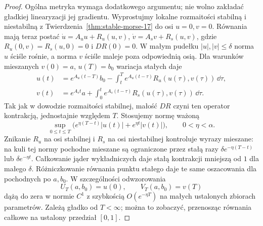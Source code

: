 \begin{proof}
Ogólna metryka wymaga dodatkowego argumentu;
nie wolno zakładać gładkiej linearyzacji jej gradientu.
Wyprostujmy lokalne rozmaitości stabilną i niestabilną
z Twierdzenia~\ref{thm:stable-morse-17} do osi $u=0,v=0$.
Równania mają teraz postać
$\dot u=A_uu+R_u(u,v)$, $\dot v=A_sv+R_s(u,v)$,
gdzie $R_u(0,v)=R_s(u,0)=0$ i $DR(0)=0$.
W małym pudełku $|u|,|v|\leq\delta$ norma $u$
ściśle rośnie, a norma $v$ ściśle maleje poza odpowiednią osią.
Dla warunków mieszanych $v(0)=a$, $u(T)=b_0$
wariacja stałych daje
\begin{align*}
 u(t)&=e^{A_u(t-T)}b_0-
       \int_t^T e^{A_u(t-\tau)}R_u(u(\tau),v(\tau))\,\dd\tau,\\
 v(t)&=e^{A_st}a+
       \int_0^t e^{A_s(t-\tau)}R_s(u(\tau),v(\tau))\,\dd\tau.
\end{align*}
Tak jak w dowodzie rozmaitości stabilnej,
małość $DR$ czyni ten operator kontrakcją,
jednostajnie względem $T$.
Stosujemy normę ważoną
\[
 \sup_{0\leq t\leq T}
 \bigl(e^{\eta(T-t)}|u(t)|+e^{\eta t}|v(t)|\bigr),
 \qquad 0<\eta<\alpha.
\]
Znikanie $R_u$ na osi stabilnej i $R_s$ na osi
niestabilnej kontroluje wyrazy mieszane: na kuli
tej normy pochodne mieszane są ograniczone przez
stałą razy $\delta e^{-\eta(T-t)}$ lub
$\delta e^{-\eta t}$. Całkowanie jąder wykładniczych
daje stałą kontrakcji mniejszą od $1$ dla małego $\delta$.
Różniczkowanie równania punktu stałego daje
te same oszacowania dla pochodnych po $a,b_0$.
W szczególności odwzorowania
\[
 U_T(a,b_0)=u(0),\qquad V_T(a,b_0)=v(T)
\]
dążą do zera w normie $C^1$ z szybkością
$O(e^{-\eta T})$ na małych ustalonych zbiorach parametrów.
Zależą gładko od $T<\infty$; można to zobaczyć,
przenosząc równania całkowe na ustalony przedział $[0,1]$.


\end{proof}
